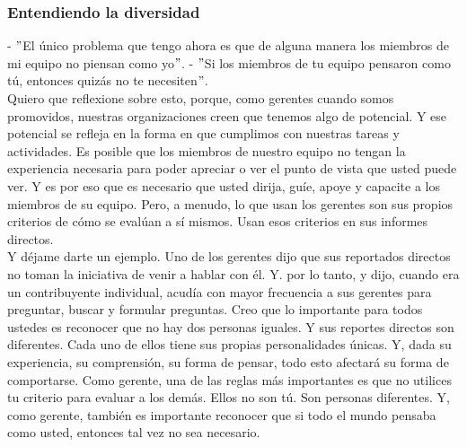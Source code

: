\documentclass[10pt]{book}
\begin{document}
\subsubsection{Entendiendo la diversidad}
- $"$El único problema que tengo ahora es que de alguna manera los miembros de mi equipo no piensan como yo$"$.  
- $"$Si los miembros de tu equipo pensaron como tú, entonces quizás no te necesiten$"$.\\
Quiero que reflexione sobre esto, porque, como gerentes cuando somos promovidos, nuestras organizaciones creen que tenemos algo de potencial. Y ese potencial se refleja en la forma en que cumplimos con nuestras tareas y actividades. Es posible que los miembros de nuestro equipo no tengan la experiencia necesaria para poder apreciar o ver el punto de vista que usted puede ver. Y es por eso que es necesario que usted dirija, guíe, apoye y capacite a los miembros de su equipo. Pero, a menudo, lo que usan los gerentes son sus propios criterios de cómo se evalúan a sí mismos. Usan esos criterios en sus informes directos.\\
Y déjame darte un ejemplo. Uno de los gerentes dijo que sus reportados directos no toman la iniciativa de venir a hablar con él. Y. por lo tanto, y dijo, cuando era un contribuyente individual, acudía con mayor frecuencia a sus gerentes para preguntar, buscar y formular preguntas. Creo que lo importante para todos ustedes es reconocer que no hay dos personas iguales. Y sus reportes directos son diferentes. Cada uno de ellos tiene sus propias personalidades únicas. Y, dada su experiencia, su comprensión, su forma de pensar, todo esto afectará su forma de comportarse. Como gerente, una de las reglas más importantes es que no utilices tu criterio para evaluar a los demás. Ellos no son tú. Son personas diferentes. Y, como gerente, también es importante reconocer que si todo el mundo pensaba como usted, entonces tal vez no sea necesario.
\end{document}
